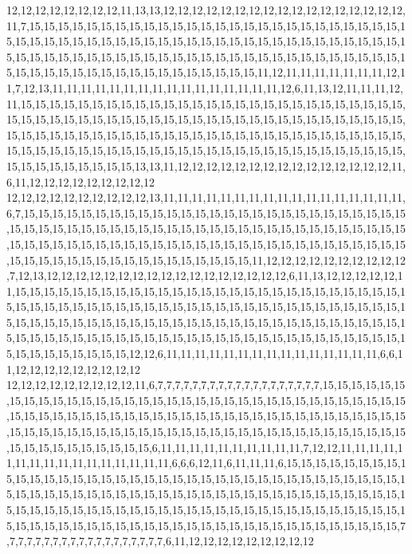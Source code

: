 12,12,12,12,12,12,12,12,11,13,13,12,12,12,12,12,12,12,12,12,12,12,12,12,12,12,12,12,11,7,15,15,15,15,15,15,15,15,15,15,15,15,15,15,15,15,15,15,15,15,15,15,15,15,15,15,15,15,15,15,15,15,15,15,15,15,15,15,15,15,15,15,15,15,15,15,15,15,15,15,15,15,15,15,15,15,15,15,15,15,15,15,15,15,15,15,15,15,15,15,15,15,15,15,15,15,15,15,15,15,15,15,15,15,15,15,15,15,15,15,15,15,15,15,15,15,15,15,15,15,11,12,11,11,11,11,11,11,11,12,11,7,12,13,11,11,11,11,11,11,11,11,11,11,11,11,11,11,11,11,12,6,11,13,12,11,11,11,12,11,15,15,15,15,15,15,15,15,15,15,15,15,15,15,15,15,15,15,15,15,15,15,15,15,15,15,15,15,15,15,15,15,15,15,15,15,15,15,15,15,15,15,15,15,15,15,15,15,15,15,15,15,15,15,15,15,15,15,15,15,15,15,15,15,15,15,15,15,15,15,15,15,15,15,15,15,15,15,15,15,15,15,15,15,15,15,15,15,15,15,15,15,15,15,15,15,15,15,15,15,15,15,15,15,15,15,15,15,15,15,15,15,15,15,15,15,15,15,15,15,13,13,11,12,12,12,12,12,12,12,12,12,12,12,12,12,12,12,11,6,11,12,12,12,12,12,12,12,12,12
12,12,12,12,12,12,12,12,12,12,13,11,11,11,11,11,11,11,11,11,11,11,11,11,11,11,11,11,6,7,15,15,15,15,15,15,15,15,15,15,15,15,15,15,15,15,15,15,15,15,15,15,15,15,15,15,15,15,15,15,15,15,15,15,15,15,15,15,15,15,15,15,15,15,15,15,15,15,15,15,15,15,15,15,15,15,15,15,15,15,15,15,15,15,15,15,15,15,15,15,15,15,15,15,15,15,15,15,15,15,15,15,15,15,15,15,15,15,15,15,15,15,15,15,15,15,15,15,15,15,11,12,12,12,12,12,12,12,12,12,12,7,12,13,12,12,12,12,12,12,12,12,12,12,12,12,12,12,12,12,12,6,11,13,12,12,12,12,12,11,15,15,15,15,15,15,15,15,15,15,15,15,15,15,15,15,15,15,15,15,15,15,15,15,15,15,15,15,15,15,15,15,15,15,15,15,15,15,15,15,15,15,15,15,15,15,15,15,15,15,15,15,15,15,15,15,15,15,15,15,15,15,15,15,15,15,15,15,15,15,15,15,15,15,15,15,15,15,15,15,15,15,15,15,15,15,15,15,15,15,15,15,15,15,15,15,15,15,15,15,15,15,15,15,15,15,15,15,15,15,15,15,15,15,15,15,15,15,15,15,12,12,6,11,11,11,11,11,11,11,11,11,11,11,11,11,11,11,6,6,11,12,12,12,12,12,12,12,12,12
12,12,12,12,12,12,12,12,12,11,6,7,7,7,7,7,7,7,7,7,7,7,7,7,7,7,7,7,7,7,15,15,15,15,15,15,15,15,15,15,15,15,15,15,15,15,15,15,15,15,15,15,15,15,15,15,15,15,15,15,15,15,15,15,15,15,15,15,15,15,15,15,15,15,15,15,15,15,15,15,15,15,15,15,15,15,15,15,15,15,15,15,15,15,15,15,15,15,15,15,15,15,15,15,15,15,15,15,15,15,15,15,15,15,15,15,15,15,15,15,15,15,15,15,15,15,15,15,15,15,6,11,11,11,11,11,11,11,11,11,11,7,12,12,11,11,11,11,11,11,11,11,11,11,11,11,11,11,11,11,6,6,6,12,11,6,11,11,11,6,15,15,15,15,15,15,15,15,15,15,15,15,15,15,15,15,15,15,15,15,15,15,15,15,15,15,15,15,15,15,15,15,15,15,15,15,15,15,15,15,15,15,15,15,15,15,15,15,15,15,15,15,15,15,15,15,15,15,15,15,15,15,15,15,15,15,15,15,15,15,15,15,15,15,15,15,15,15,15,15,15,15,15,15,15,15,15,15,15,15,15,15,15,15,15,15,15,15,15,15,15,15,15,15,15,15,15,15,15,15,15,15,15,15,15,15,15,15,15,15,7,7,7,7,7,7,7,7,7,7,7,7,7,7,7,7,7,7,7,6,11,12,12,12,12,12,12,12,12,12
